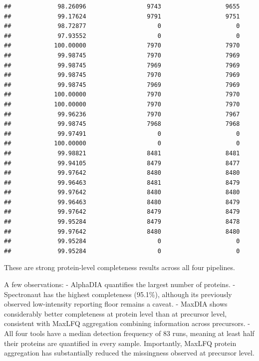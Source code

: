 \documentclass[
  10pt,
]{article}
\begin{document}
\begin{verbatim}
##             98.26096                 9743                  9655
##             99.17624                 9791                  9751
##             98.72877                    0                     0
##             97.93552                    0                     0
##            100.00000                 7970                  7970
##             99.98745                 7970                  7969
##             99.98745                 7969                  7969
##             99.98745                 7970                  7969
##             99.98745                 7969                  7969
##            100.00000                 7970                  7970
##            100.00000                 7970                  7970
##             99.96236                 7970                  7967
##             99.98745                 7968                  7968
##             99.97491                    0                     0
##            100.00000                    0                     0
##             99.98821                 8481                  8481
##             99.94105                 8479                  8477
##             99.97642                 8480                  8480
##             99.96463                 8481                  8479
##             99.97642                 8480                  8480
##             99.96463                 8480                  8479
##             99.97642                 8479                  8479
##             99.95284                 8479                  8478
##             99.97642                 8480                  8480
##             99.95284                    0                     0
##             99.95284                    0                     0
\end{verbatim}

These are strong protein-level completeness results across all four
pipelines.

A few observations: - AlphaDIA quantifies the largest number of
proteins. - Spectronaut has the highest completeness (95.1\%), although
its previously observed low-intensity reporting floor remains a caveat.
- MaxDIA shows considerably better completeness at protein level than at
precursor level, consistent with MaxLFQ aggregation combining
information across precursors. - All four tools have a median detection
frequency of 83 runs, meaning at least half their proteins are
quantified in every sample. Importantly, MaxLFQ protein aggregation has
substantially reduced the missingness observed at precursor level.
\end{document}
